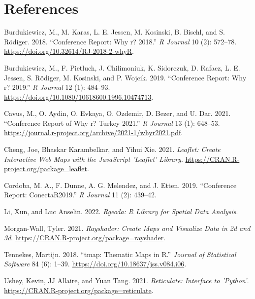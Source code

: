 \hypertarget{references}{%
\section*{References}\label{references}}

\hypertarget{refs}{}
\begin{CSLReferences}{1}{0}
\leavevmode{}%
Burdukiewicz, M., M. Karas, L. E. Jessen, M. Kosinski, B. Bischl, and S. Rödiger. 2018. {``Conference Report: Why r? 2018.''} \emph{R Journal} 10 (2): 572--78. \url{https://doi.org/10.32614/RJ-2018-2-whyR}.

\leavevmode{}%
Burdukiewicz, M., F. Pietluch, J. Chilimoniuk, K. Sidorczuk, D. Rafacz, L. E. Jessen, S. Rödiger, M. Kosinski, and P. Wojcik. 2019. {``Conference Report: Why r? 2019.''} \emph{R Journal} 12 (1): 484--93. \url{https://doi.org/10.1080/10618600.1996.10474713}.

\leavevmode{}%
Cavus, M., O. Aydin, O. Evkaya, O. Ozdemir, D. Bezer, and U. Dar. 2021. {``Conference Report of Why r? Turkey 2021.''} \emph{R Journal} 13 (1): 648--53. \url{https://journal.r-project.org/archive/2021-1/whyr2021.pdf}.

\leavevmode{}%
Cheng, Joe, Bhaskar Karambelkar, and Yihui Xie. 2021. \emph{Leaflet: Create Interactive Web Maps with the JavaScript 'Leaflet' Library}. \url{https://CRAN.R-project.org/package=leaflet}.

\leavevmode{}%
Cordoba, M. A., F. Dunne, A. G. Melendez, and J. Etten. 2019. {``Conference Report: ConectaR2019.''} \emph{R Journal} 11 (2): 439--42.

\leavevmode{}%
Li, Xun, and Luc Anselin. 2022. \emph{Rgeoda: R Library for Spatial Data Analysis}.

\leavevmode{}%
Morgan-Wall, Tyler. 2021. \emph{Rayshader: Create Maps and Visualize Data in 2d and 3d}. \url{https://CRAN.R-project.org/package=rayshader}.

\leavevmode{}%
Tennekes, Martijn. 2018. {``{tmap}: Thematic Maps in {R}.''} \emph{Journal of Statistical Software} 84 (6): 1--39. \url{https://doi.org/10.18637/jss.v084.i06}.

\leavevmode{}%
Ushey, Kevin, JJ Allaire, and Yuan Tang. 2021. \emph{Reticulate: Interface to 'Python'}. \url{https://CRAN.R-project.org/package=reticulate}.


\end{CSLReferences}
